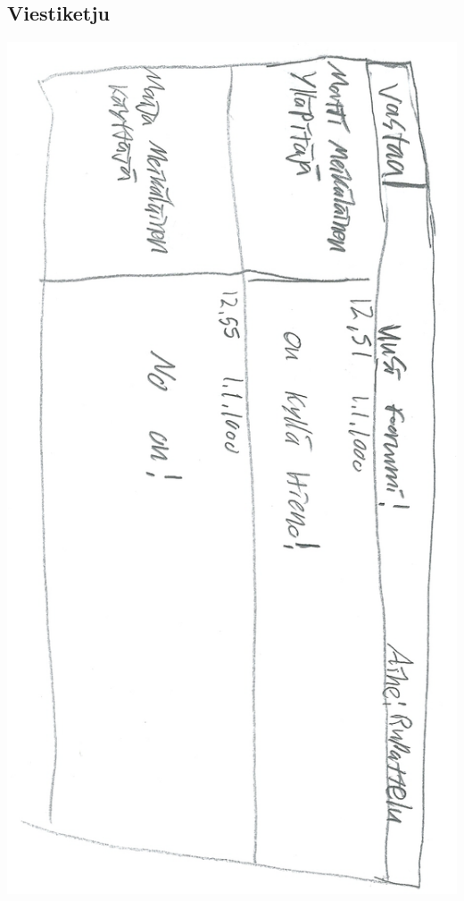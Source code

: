 \documentclass[a4paper, 12pt, finnish]{article}
\begin{document}
\subsection{Viestiketju}
\includegraphics[width=\textwidth,height=\textheight,keepaspectratio]{viestiketju.png}
\end{document}
